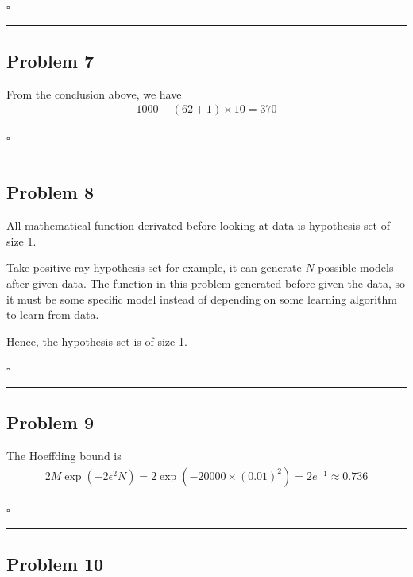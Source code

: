 \documentclass[12pt]{article}
\newcommand*{\QEDB}{\hfill\ensuremath{\square}}
\newcommand{\ParTh}[1]{\left(#1\right)}
\newcommand{\horrule}[1]{\rule{\linewidth}{#1}}
\begin{document}
\QEDB

\horrule{0.5pt}

\subsection*{Problem 7}

From the conclusion above, we have
\begin{align}
1000-\ParTh{62+1}\times10=370
\end{align}

\QEDB

\horrule{0.5pt}

\subsection*{Problem 8}

All mathematical function derivated before looking at data is hypothesis set of size 1.

Take positive ray hypothesis set for example, it can generate $N$ possible models after given data. The function in this problem generated before given the data, so it must be some specific model instead of depending on some learning algorithm to learn from data.

Hence, the hypothesis set is of size 1.

\QEDB

\horrule{0.5pt}

\subsection*{Problem 9}

The Hoeffding bound is
\begin{align}
2M\exp\ParTh{-2\epsilon^2N}=2\exp\ParTh{-20000\times\ParTh{0.01}^2}=2e^{-1}\approx0.736
\end{align}

\QEDB

\horrule{0.5pt}

\subsection*{Problem 10}
\end{document}
